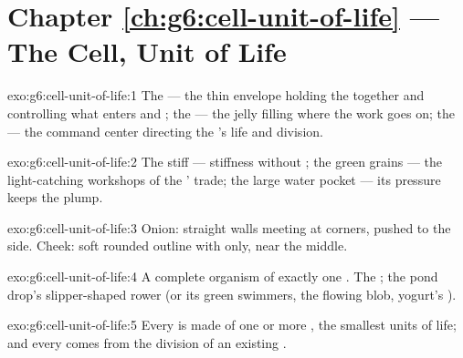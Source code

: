 \section*{Chapter \ref{ch:g6:cell-unit-of-life} --- The Cell, Unit of Life}

\begin{solution}{exo:g6:cell-unit-of-life:1}
The  --- the thin envelope holding the  together
and controlling what enters and ; the  ---
the jelly filling where the work goes on; the  ---
the command center directing the 's life and division.
\end{solution}

\begin{solution}{exo:g6:cell-unit-of-life:2}
The stiff  ---  stiffness without ; the
green grains --- the light-catching workshops of the
' trade; the large water pocket --- its pressure
keeps the  plump.
\end{solution}

\begin{solution}{exo:g6:cell-unit-of-life:3}
Onion: straight walls meeting at corners,  pushed to
the side. Cheek: soft rounded outline with  only,
 near the middle.
\end{solution}

\begin{solution}{exo:g6:cell-unit-of-life:4}
A complete organism of exactly one . The ; the
pond drop's slipper-shaped rower (or its green swimmers,
the flowing blob, yogurt's ).
\end{solution}

\begin{solution}{exo:g6:cell-unit-of-life:5}
Every  is made of one or more , the
smallest units of life; and every  comes from the
division of an existing .
\end{solution}

